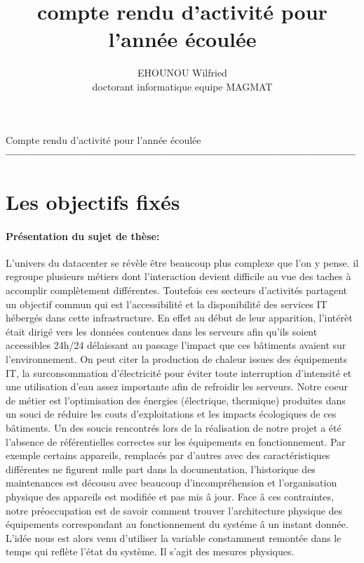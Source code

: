\documentclass [a4paper,10pt]{article}
\title{ compte rendu d'activit\'e pour l'ann\'ee \'ecoul\'ee}
\author{EHOUNOU Wilfried\\ doctorant informatique equipe MAGMAT }
\begin{document}
	{\LARGE  Compte rendu d'activit\'e pour l'ann\'ee \'ecoul\'ee} \\
{ \bf ---------------------------------------------------------------------------------------------}
	\section{Les objectifs fix\'es}
		\paragraph{Pr\'esentation du sujet de th\`ese: }
		
L'univers du datacenter se r\'ev\`ele \^etre beaucoup plus complexe que l'on y pense. il regroupe plusieurs m\'etiers dont l'interaction devient difficile au vue des taches \`a accomplir compl\`etement diff\'erentes. Toutefois ces secteurs d'activit\'es partagent un objectif commun qui est l'accessibilit\'e et la disponibilit\'e des services IT h\'eberg\'es dans cette infrastructure. En effet au d\'ebut de leur apparition, l'int\'er\`et \'etait dirig\'e vers les donn\'ees contenues dans les serveurs afin qu'ils soient accessibles 24h/24 d\'elaissant au passage l'impact que ces b\^atiments avaient sur l'environnement. On peut citer la production de chaleur issues des \'equipements IT, la surconsommation d'\'electricit\'e pour \'eviter toute interruption d'intensit\'e et une utilisation d'eau assez importante afin de refroidir les serveurs.\newline
Notre coeur de m\'etier est l'optimisation des \'energies (\'electrique, thermique) produites dans un souci de r\'eduire les couts d'exploitations et les impacts \'ecologiques de ces b\^atiments. Un des soucis rencontr\'es lors de la r\'ealisation de notre projet a \'et\'e l'absence de r\'ef\'erentielles correctes sur les \'equipements en fonctionnement. Par exemple certains appareils, remplac\'es par d'autres avec des caract\'eristiques diff\'erentes ne figurent nulle part dans la documentation, l'historique des maintenances est d\'ecousu avec beaucoup d'incompr\'ehension et l'organisation physique des appareils est modifi\'ee et pas mis \^a jour.\newline
 Face \^a ces contraintes, notre pr\'eoccupation est de savoir comment trouver l'architecture physique des \'equipements correspondant au fonctionnement du syst\'eme \^a un instant donn\'ee. L'id\'ee nous est alors venu d'utiliser la variable constamment remont\'ee dans le temps qui refl\`ete l'\'etat du syst\`eme. Il s'agit des mesures physiques. 
\end{document}
